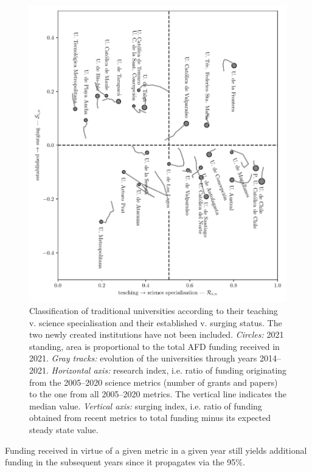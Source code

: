 \documentclass[twocolumn]{article}
\begin{document}
\begin{figure}[p]
\centering
\includegraphics{pdf/afd-specialisation.pdf}
\caption{Classification of traditional universities according to their teaching v. science specialisation and their established v. surging status. The two newly created institutions have not been included. \textit{Circles:} 2021 standing, area is proportional to the total AFD funding received in 2021. \textit{Gray tracks:} evolution of the universities through years 2014--2021. \textit{Horizontal axis:} research index, i.e. ratio of funding originating from the 2005--2020 science metrics (number of grants and papers) to the one from all 2005--2020 metrics. The vertical line indicates the median value. \textit{Vertical axis:} surging index, i.e. ratio of funding obtained from recent metrics to total funding minus its expected steady state value.  }
\label{fig:classification}
\end{figure}

Funding received in virtue of a given metric in a given year still yields additional funding in the subsequent years since it propagates via the 95\%.
\end{document}
